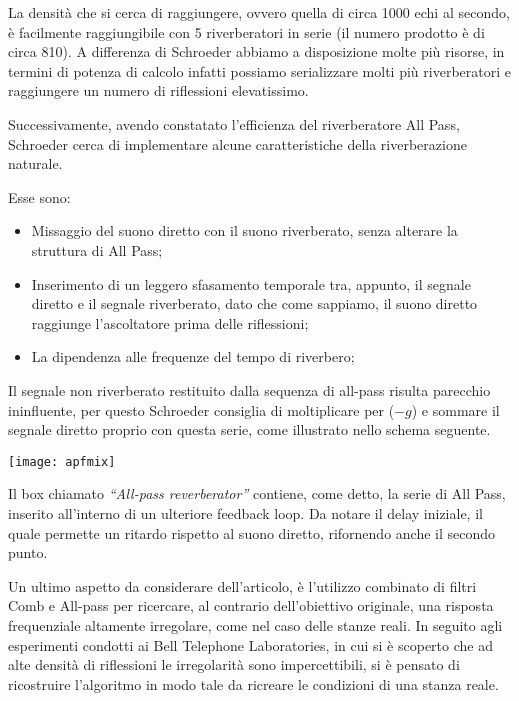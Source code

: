 La densità che si cerca di raggiungere, ovvero quella di circa 1000 echi al secondo, è facilmente raggiungibile con 5 riverberatori in serie (il numero prodotto è di circa 810). A differenza di Schroeder abbiamo a disposizione molte più risorse, in termini di potenza di calcolo infatti possiamo serializzare molti più riverberatori e raggiungere un numero di riflessioni elevatissimo.

Successivamente, avendo constatato l’efficienza del riverberatore All Pass, Schroeder cerca di implementare alcune caratteristiche della riverberazione naturale.

Esse sono:

\begin{itemize}
\item Missaggio del suono diretto con il suono riverberato, senza alterare la struttura di All Pass;
\item Inserimento di un leggero sfasamento temporale tra, appunto, il segnale diretto e il segnale riverberato, dato che come sappiamo, il suono diretto raggiunge l’ascoltatore prima delle riflessioni;
\item La dipendenza alle frequenze del tempo di riverbero;
\end{itemize}

Il segnale non riverberato restituito dalla sequenza di all-pass risulta parecchio ininfluente, per questo Schroeder consiglia di moltiplicare per ($-g$) e sommare il segnale diretto proprio con questa serie, come illustrato nello schema seguente.

\begin{center}
\texttt{[image: apfmix]}
\end{center}

Il box chiamato \emph{“All-pass reverberator”} contiene, come detto, la serie di All Pass, inserito all’interno di un ulteriore feedback loop.
Da notare il delay iniziale, il quale permette un ritardo rispetto al suono diretto, rifornendo anche il secondo punto.

\bigskip

Un ultimo aspetto da considerare dell’articolo,  è l’utilizzo combinato di filtri Comb e All-pass per ricercare, al contrario dell’obiettivo originale, una risposta frequenziale altamente irregolare, come nel caso delle stanze reali.
In seguito agli esperimenti condotti ai Bell Telephone Laboratories, in cui si è scoperto che ad alte densità di riflessioni le irregolarità sono impercettibili, si è pensato di ricostruire l’algoritmo in modo tale da ricreare le condizioni di una stanza reale.

